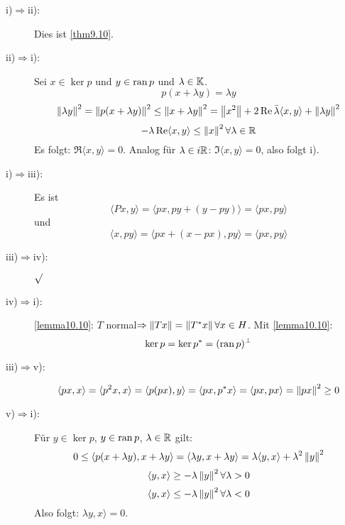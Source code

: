 \begin{beweis}
	\begin{description}
		\item[i)$ \Rightarrow $ii):] Dies ist \ref{thm9.10}.
		\item[ii)$ \Rightarrow $i):] Sei $ x\in\ker p $ und $ y\in\operatorname{ran} p $ und $ \lambda\in\mathbb{K} $.
		\[ p(x+\lambda y)=\lambda y \]
		\[ \left\|\lambda y\right\|^2=\left\|p(x+\lambda y)\right\|^2\leq\left\|x+\lambda y\right\|^2=\left\|x^2\right\|+2\operatorname{Re}\bar{\lambda}\langle x,y\rangle+\left\|\lambda y\right\|^2 \]
		\[ -\lambda\operatorname{Re}\langle x,y\rangle\leq\left\|x\right\|^2\forall\lambda\in\mathbb{R}  \]
		Es folgt: $ \Re\langle x,y\rangle=0 $. Analog f\"ur $ \lambda\in i\mathbb{R} $: $ \Im\langle x,y\rangle=0 $, also folgt i).
		\item[i)$ \Rightarrow $iii):] Es ist \[ \langle Px,y\rangle=\langle px,py+(y-py)\rangle=\langle px,py\rangle \]
		und
		\[ \langle x,py\rangle=\langle px+(x-px),py\rangle=\langle px,py\rangle \]
		\item[iii)$ \Rightarrow $iv):] $ \surd $
		\item[iv)$ \Rightarrow $i):] \ref{lemma10.10}: $ T $ normal$ \Rightarrow \left\|Tx\right\|=\left\|T^\ast x\right\|\forall x\in H$. Mit \ref{lemma10.10}:
		\[ \ker p=\ker p^\ast=(\operatorname{ran} p)^\perp \]
		\item[iii)$ \Rightarrow $v):] \[ \langle px,x\rangle=\langle p^2x,x\rangle=\langle p(px),y\rangle=\langle px,p^\ast x\rangle=\langle px,px\rangle=\left\|px\right\|^2\geq 0 \]\item[v)$ \Rightarrow $i):] F\"ur $  y\in\ker p $, $ y\in\operatorname{ran} p $, $ \lambda\in\mathbb{R} $ gilt:
		\[ 0\leq\langle p(x+\lambda y), x+\lambda y\rangle=\langle\lambda y,x+\lambda y\rangle=\lambda\langle y,x\rangle+\lambda^2\left\|y\right\|^2 \]
		\[ \langle y,x\rangle\geq -\lambda\left\|y\right\|^2\forall\lambda>0 \]
		\[ \langle y,x\rangle\leq-\lambda\left\|y\right\|^2\forall\lambda<0 \]
		Also folgt: $ \lambda y,x\rangle=0 $.
	\end{description}
\end{beweis}
